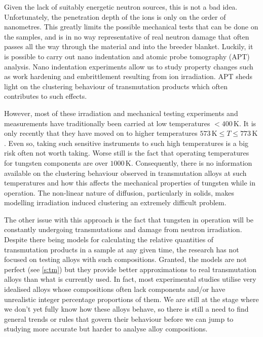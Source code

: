 \documentclass[12pt, a4paper]{article}
\begin{document}
		Given the lack of suitably energetic neutron sources, this is not a bad idea. Unfortunately, the penetration depth of the ions is only on the order of nanometres. This greatly limits the possible mechanical tests that can be done on the samples, and is in no way representative of real neutron damage that often passes all the way through the material and into the breeder blanket. Luckily, it is possible to carry out nano indentation and atomic probe tomography (APT) analysis. Nano indentation experiments allow us to study property changes such as work hardening and embrittlement resulting from ion irradiation. APT sheds light on the clustering behaviour of transmutation products which often contributes to such effects.
		
		However, most of these irradiation and mechanical testing experiments and measurements have traditionally been carried at low temperatures $< 400\,\textrm{K}$. It is only recently that they have moved on to higher temperatures $573\,\textrm{K} \le T \le 773\,\textrm{K}$. Even so, taking such sensitive instruments to such high temperatures is a big risk often not worth taking. Worse still is the fact that operating temperatures for tungsten components are over $1000\,\textrm{K}$. Consequently, there is no information available on the clustering behaviour observed in transmutation alloys at such temperatures and how this affects the mechanical properties of tungsten while in operation. The non-linear nature of diffusion, particularly in solids, makes modelling irradiation induced clustering an extremely difficult problem.
		
		The other issue with this approach is the fact that tungsten in operation will be constantly undergoing transmutations and damage from neutron irradiation. Despite there being models for calculating the relative quantities of transmutation products in a sample at any given time, the research has not focused on testing alloys with such compositions. Granted, the models are not perfect (see \cref{s:tm}) but they provide better approximations to real transmutation alloys than what is currently used. In fact, most experimental studies utilise very idealised alloys whose compositions often lack components and/or have unrealistic integer percentage proportions of them. We are still at the stage where we don't yet fully know how these alloys behave, so there is still a need to find general trends or rules that govern their behaviour before we can jump to studying more accurate but harder to analyse alloy compositions.
\end{document}
